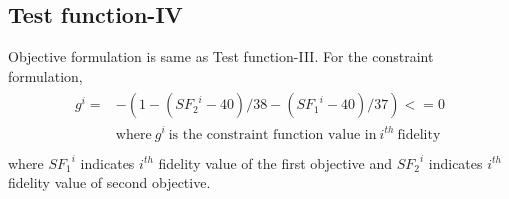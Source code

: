 \subsection{Test function-IV}
\noindent Objective formulation is same as Test function-III. For the constraint formulation, \\
{\small
	\begin{align}
		\begin{split}
			g^i = {}&-(1 - ({SF_2}^i - 40)/38 - ({SF_1}^i - 40)/37) <= 0\\
			&\text{where}~g^i~\text{is the constraint function value in}~i^{th}~\text{fidelity}\\
			\label{eq:testfunc4} 
		\end{split}
	\end{align}
}%
where ${SF_1}^i$ indicates $i^{th}$ fidelity value of the first objective and ${SF_2}^i$ indicates $i^{th}$ fidelity value of second objective.
 
